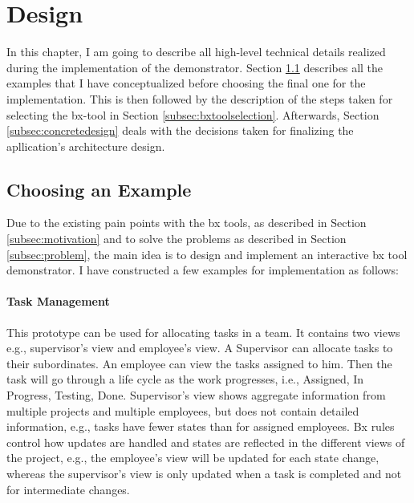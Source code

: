 \section{Design}\label{sec:design}
In this chapter, I am going to describe all high-level technical details realized during the implementation of the demonstrator. Section \ref{subsec:examples} describes all the examples that I have conceptualized before choosing the final one for the implementation. This is then followed by
the description of the steps taken for selecting the bx-tool in Section \ref{subsec:bxtoolselection}. Afterwards, Section \ref{subsec:concretedesign} deals with the decisions taken for finalizing the apllication's architecture design.
\subsection{Choosing an Example}\label{subsec:examples}
Due to the existing pain points with the bx tools, as described in Section \ref{subsec:motivation} and to solve the problems as described in Section \ref{subsec:problem}, the main idea is to design and implement an interactive bx tool demonstrator.
I have constructed a few examples for implementation as follows:
\paragraph{Task Management} This prototype can be used for allocating tasks in a team. It contains two views e.g., supervisor's view and employee's view. A Supervisor can allocate tasks to their subordinates. An employee can view the tasks assigned to him. Then the task will go through a life cycle as the work progresses, i.e., Assigned, In Progress, Testing, Done. Supervisor's view shows aggregate information from multiple projects and multiple employees, but does not contain detailed information, e.g., tasks have fewer states than for assigned employees. Bx rules control how updates are handled and states are reflected in the different views of the project, e.g., the employee's view will be updated for each state change, whereas the supervisor's view is only updated when a task is completed and not for intermediate changes.

